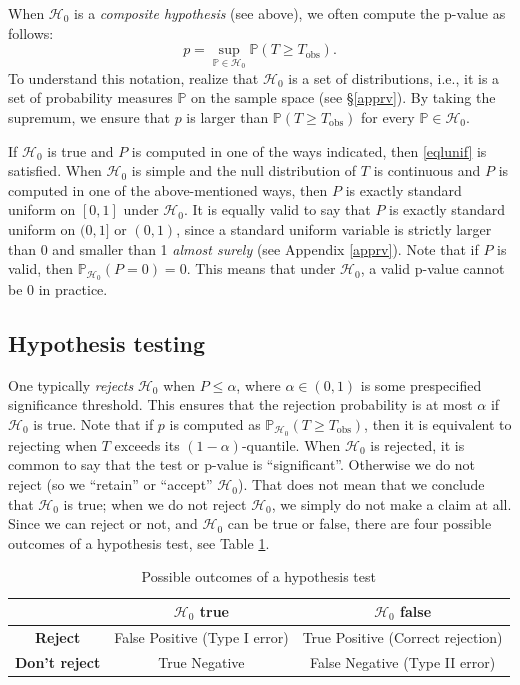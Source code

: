 \documentclass[11pt]{article}
\theoremstyle{plain}
\theoremstyle{definition}
\newcommand{\Hy}{\mathcal{H}}
\newcommand{\pr}{\mathbb{P}}
\begin{document}
When $\Hy_0$ is a \emph{composite hypothesis} (see above), we often compute the p-value as follows:
$$p = \sup_{\pr\in\Hy_0}\pr(T\geq T_{\text{obs}}).$$
To understand this notation, realize that $\Hy_0$ is a set of distributions, i.e., it is a set of probability measures $\pr$ on the sample space (see \S\ref{apprv}). By taking the supremum, we ensure that $p$ is larger than 
$\pr(T\geq T_{\text{obs}})$ for every $\pr\in\Hy_0$.

If $\Hy_0$ is true and $P$ is computed in one of the ways indicated, then \eqref{eqlunif} is satisfied.
When $\Hy_0$ is simple and the null distribution of $T$ is continuous and $P$ is computed in one of the above-mentioned ways, then $P$ is exactly standard uniform on $[0,1]$ under $\Hy_0$. It is equally valid to say that $P$ is exactly standard uniform on $(0,1]$ or $(0,1)$, since a standard uniform variable is strictly larger than 0 and smaller than 1 \emph{almost surely} (see Appendix \ref{apprv}).
Note that if $P$ is valid, then $\pr_{\Hy_0}(P=0)=0$. This means that under $\Hy_0$, a valid p-value cannot be 0 in practice.





\subsection{Hypothesis testing}

One typically \emph{rejects} $\Hy_0$ when $P\leq \alpha$, where $\alpha\in(0,1)$ is some prespecified significance threshold. This ensures that the rejection probability is at most $\alpha$ if $\Hy_0$ is true. Note that if $p$ is computed as $\pr_{\Hy_0}(T\geq T_{\text{obs}})$, then it is equivalent to  rejecting when $T$ exceeds its $(1-\alpha)$-quantile. When $\Hy_0$ is rejected, it is common to say that the test or p-value is ``significant''. Otherwise we do not reject (so we ``retain'' or  ``accept'' $\Hy_0$). That does not mean that we conclude that $\Hy_0$ is true; when we do not reject $\Hy_0$, we simply do not make a claim at all. Since we can reject or not, and $\Hy_0$ can be true or false, there are four possible outcomes of a hypothesis test, see Table \ref{tabtestoutc}. 








\begin{table}[h]
\centering
\begin{tabular}{ c c c } 
\hline
 & \textbf{$\Hy_0$ true} & \textbf{$\Hy_0$ false} \\
\hline
\textbf{Reject } 
& False Positive (Type I error) 
& True Positive (Correct rejection) \\
\hline
\textbf{Don't reject} 
& True Negative  
& False Negative (Type II error) \\
\hline
\end{tabular}
\caption{Possible outcomes of a hypothesis test}
\label{tabtestoutc}
\end{table}
\end{document}
